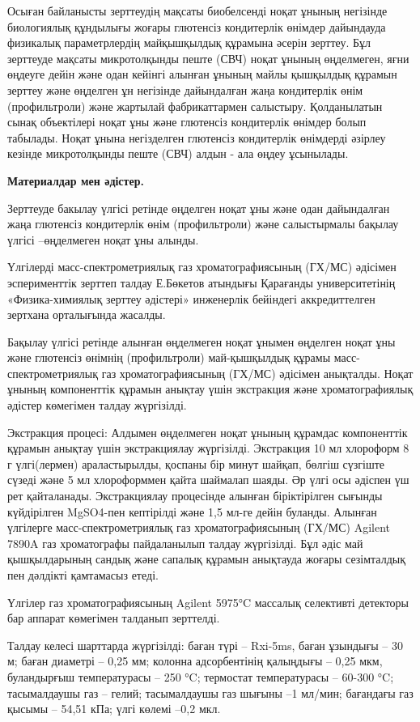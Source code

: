 Осыған байланысты зерттеудің мақсаты биобелсенді ноқат ұнының негізінде
биологиялық құндылығы жоғары глютенсіз кондитерлік өнімдер дайындауда
физикалық параметрлердің майқышқылдық құрамына әсерін зерттеу. Бұл
зерттеуде мақсаты микротолқынды пеште (СВЧ) ноқат ұнының өңделмеген,
яғни өңдеуге дейін және одан кейінгі алынған ұнының майлы қышқылдық
құрамын зерттеу және өңделген ұн негізінде дайындалған жаңа кондитерлік
өнім (профильтроли) және жартылай фабрикаттармен салыстыру. Қолданылатын
сынақ объектілері ноқат ұны және глютенсіз кондитерлік өнімдер болып
табылады. Ноқат ұнына негізделген глютенсіз кондитерлік өнімдерді
әзірлеу кезінде микротолқынды пеште (СВЧ) алдын - ала өңдеу ұсынылады.

{\bfseries Материалдар мен әдістер.}

Зерттеуде бакылау үлгісі ретінде өңделген ноқат ұны және одан
дайындалған жаңа глютенсіз кондитерлік өнім (профильтроли) және
салыстырмалы бақылау үлгісі --өңделмеген ноқат ұны алынды.

Үлгілерді масс-спектрометриялық газ хроматографиясының (ГХ/МС) әдісімен
эсперименттік зерттеп талдау Е.Бөкетов атындығы Қарағанды
университетінің «Физика-химиялық зерттеу әдістері» инженерлік бейіндегі
аккредиттелген зертхана орталығында жасалды.

Бақылау үлгісі ретінде алынған өңделмеген ноқат ұнымен өңделген ноқат
ұны және глютенсіз өнімнің (профильтроли) май-қышқылдық құрамы
масс-спектрометриялық газ хроматографиясының (ГХ/МС) әдісімен анықталды.
Ноқат ұнының компоненттік құрамын анықтау үшін экстракция және
хроматографиялық әдістер көмегімен талдау жүргізілді.

Экстракция процесі: Алдымен өңделмеген ноқат ұнының құрамдас
компоненттік құрамын анықтау үшін экстракциялау жүргізілді. Экстракция
10 мл хлороформ 8 г үлгі(лермен) араластырылды, қоспаны бір минут
шайқап, бөлгіш сүзгіште сүзеді және 5 мл хлороформмен қайта шаймалап
шаяды. Әр үлгі осы әдіспен үш рет қайталанады. Экстракциялау процесінде
алынған біріктірілген сығынды күйдірілген MgSO4-пен кептірілді және 1,5
мл-ге дейін буланды. Алынған үлгілерге масс-спектрометриялық газ
хроматографиясының (ГХ/МС) Agilent 7890A газ хроматографы пайдаланылып
талдау жүргізілді. Бұл әдіс май қышқылдарының сандық және сапалық
құрамын анықтауда жоғары сезімталдық пен дәлдікті қамтамасыз етеді.

Үлгілер газ хроматографиясының Agilent 5975°C массалық селективті
детекторы бар аппарат көмегімен талданып зерттелді.

Талдау келесі шарттарда жүргізілді: баған түрі -- Rxi-5ms, баған
ұзындығы -- 30 м; баған диаметрі -- 0,25 мм; колонна адсорбентінің
қалыңдығы -- 0,25 мкм, буландырғыш температурасы -- 250 °C; термостат
температурасы -- 60-300 °C; тасымалдаушы газ -- гелий; тасымалдаушы газ
шығыны --1 мл/мин; бағандағы газ қысымы -- 54,51 кПа; үлгі көлемі --0,2
мкл.

